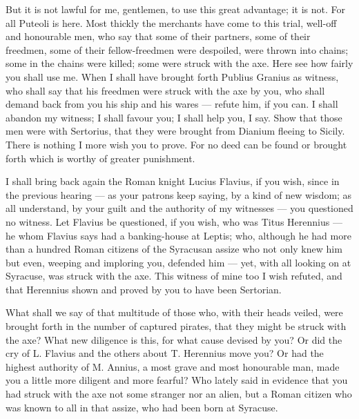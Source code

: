  But it is not lawful for me, gentlemen, to use this great advantage; it is not. For all Puteoli is here. Most thickly the merchants have come to this trial, well-off and honourable men, who say that some of their partners, some of their freedmen, some of their fellow-freedmen were despoiled, were thrown into chains; some in the chains were killed; some were struck with the axe. Here see how fairly you shall use me. When I shall have brought forth Publius Granius as witness, who shall say that his freedmen were struck with the axe by you, who shall demand back from you his ship and his wares --- refute him, if you can. I shall abandon my witness; I shall favour you; I shall help you, I say. Show that those men were with Sertorius, that they were brought from Dianium fleeing to Sicily. There is nothing I more wish you to prove. For no deed can be found or brought forth which is worthy of greater punishment.

 I shall bring back again the Roman knight Lucius Flavius, if you wish, since in the previous hearing --- as your patrons keep saying, by a kind of new wisdom; as all understand, by your guilt and the authority of my witnesses --- you questioned no witness. Let Flavius be questioned, if you wish, who was Titus Herennius --- he whom Flavius says had a banking-house at Leptis; who, although he had more than a hundred Roman citizens of the Syracusan assize who not only knew him but even, weeping and imploring you, defended him --- yet, with all looking on at Syracuse, was struck with the axe. This witness of mine too I wish refuted, and that Herennius shown and proved by you to have been Sertorian.

 What shall we say of that multitude of those who, with their heads veiled, were brought forth in the number of captured pirates, that they might be struck with the axe? What new diligence is this, for what cause devised by you? Or did the cry of L. Flavius and the others about T. Herennius move you? Or had the highest authority of M. Annius, a most grave and most honourable man, made you a little more diligent and more fearful? Who lately said in evidence that you had struck with the axe not some stranger nor an alien, but a Roman citizen who was known to all in that assize, who had been born at Syracuse.

